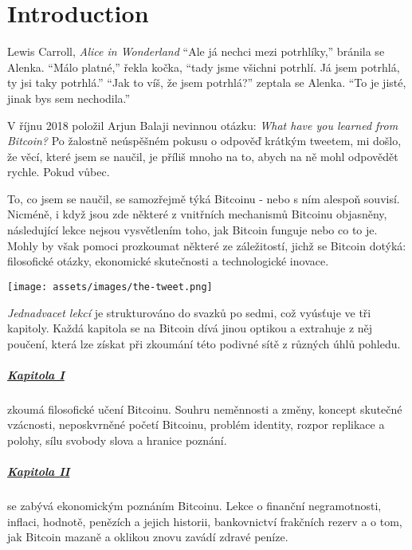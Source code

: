 \chapter*{Introduction}
\label{ch:introduction}

\begin{chapquote}{Lewis Carroll, \textit{Alice in Wonderland}}
\enquote{Ale já nechci mezi potrhlíky,} bránila se Alenka. \enquote{Málo platné,} 
řekla kočka, \enquote{tady jsme všichni potrhlí. Já jsem potrhlá, ty jsi taky 
potrhlá.} \enquote{Jak to víš, že jsem potrhlá?} zeptala se Alenka. \enquote{To je 
jisté, jinak bys sem nechodila.}\end{chapquote}

V říjnu 2018 položil Arjun Balaji nevinnou otázku: 
\textit{What have you learned from Bitcoin?} Po žalostně neúspěšném pokusu 
o odpověď krátkým tweetem, mi došlo, že věcí, které jsem se naučil, je příliš 
mnoho na to, abych na ně mohl odpovědět rychle. Pokud vůbec.

To, co jsem se naučil, se samozřejmě týká Bitcoinu - nebo s ním alespoň souvisí. 
Nicméně, i když jsou zde některé z vnitřních mechanismů Bitcoinu objasněny, 
následující lekce nejsou vysvětlením toho, jak Bitcoin funguje nebo co to je. 
Mohly by však pomoci prozkoumat některé ze záležitostí, jichž se Bitcoin dotýká: 
filosofické otázky, ekonomické skutečnosti a technologické inovace.

\begin{center}
  \texttt{[image: assets/images/the-tweet.png]}
\end{center}

\textit{Jednadvacet lekcí} je strukturováno do svazků po sedmi, což vyúsťuje 
ve tři kapitoly. Každá kapitola se na Bitcoin dívá jinou optikou a extrahuje 
z něj poučení, která lze získat při zkoumání této podivné sítě z různých 
úhlů pohledu.

\paragraph{\hyperref[ch:philosophy]{Kapitola I}}{zkoumá filosofické učení 
Bitcoinu. Souhru neměnnosti a změny, koncept skutečné vzácnosti, neposkvrněné 
početí Bitcoinu, problém identity, rozpor replikace a polohy, sílu svobody 
slova a hranice poznání.
}

\paragraph{\hyperref[ch:economics]{Kapitola II}}{se zabývá ekonomickým poznáním 
Bitcoinu. Lekce o finanční negramotnosti, inflaci, hodnotě, penězích a jejich 
historii, bankovnictví frakčních rezerv a o tom, jak Bitcoin mazaně a oklikou 
znovu zavádí zdravé peníze.}

